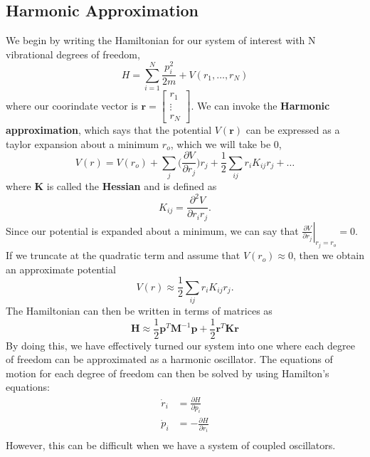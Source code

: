 \documentclass{article}
\newcommand{\be}{\begin{equation}}
\newcommand{\ee}{\end{equation}}
\newcommand{\br}{\textbf{r}}
\newcommand{\bp}{\textbf{p}}
\newcommand{\bm}{\textbf{M}}
\newcommand{\bk}{\textbf{K}}
\begin{document}
\subsection{Harmonic Approximation}
We begin by writing the Hamiltonian for our system of interest with N vibrational degrees of freedom,
\be
  H = \sum_{i = 1}^{N} \frac{p^2_i}{2 m} + V(r_1, \dots, r_N)
\ee
where our coorindate vector is $\br = \begin{bmatrix} r_1 \\ \vdots \\ r_N \end{bmatrix}$.
We can invoke the \textbf{Harmonic approximation}, which says that the potential $V(\br)$ can be expressed as a taylor expansion about a minimum $r_o$, which we will take be 0,
\be
  V(r) = V(r_o) + \sum_j \Big( \frac{\partial V}{\partial r_j} \Big) r_j + \frac{1}{2} \sum_{i j} r_i K_{i j} r_j + \dots
\ee
where $\bk$ is called the \textbf{Hessian} and is defined as
\be
  K_{i j} = \frac{\partial^2 V}{\partial r_i r_j} .
\ee
Since our potential is expanded about a minimum, we can say that $\left. \frac{\partial V}{\partial r_j} \right|_{r_j = r_o} = 0$.
If we truncate at the quadratic term and assume that $V(r_o) \approx 0$, then we obtain an approximate potential
\be
  V(r) \approx \frac{1}{2} \sum_{i j} r_i K_{i j} r_j .
\ee
The Hamiltonian can then be written in terms of matrices as
\be \label{eq:gen_hamil}
  \textbf{H} \approx \frac{1}{2} \bp^T \bm^{-1} \bp + \frac{1}{2} \textbf{r}^{T} \bk \textbf{r}
\ee
By doing this, we have effectively turned our system into one where each degree of freedom can be approximated as a harmonic oscillator.
The equations of motion for each degree of freedom can then be solved by using Hamilton's equations:
\be
  \begin{split}
    \dot{r}_i &= \frac{\partial H}{\partial p_i} \\
    \dot{p}_i &= - \frac{\partial H}{\partial r_i} \\
  \end{split}
\ee
However, this can be difficult when we have a system of coupled oscillators.
\end{document}
